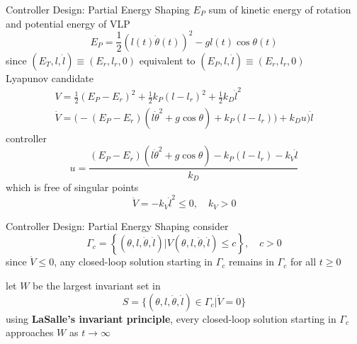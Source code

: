 \documentclass[10pt]{beamer}
\begin{document}
  \begin{frame}{Controller Design: Partial Energy Shaping}
    $E_P$ sum of kinetic energy of rotation and potential energy of VLP
    \begin{equation*}
      E_P = \frac{1}{2}(l(t)\dot{\theta}(t))^2-gl(t)\cos\theta(t)
    \end{equation*}
    since $(E_T, l, \dot{l}) \equiv (E_r, l_r, 0)$ equivalent to
    $(E_P, l, \dot{l}) \equiv (E_r, l_r, 0)$
    \\
    Lyapunov candidate
    \begin{gather*}
      V = \frac{1}{2}(E_P-E_r)^2+\frac{1}{2}k_P(l-l_r)^2+
        \frac{1}{2}k_D\dot{l}^2 \\ 
      \dot{V} = \big(-(E_P-E_r)(l\dot{\theta}^2+g\cos\theta)+k_P(l-l_r)\big)
        + k_D u) \dot{l}
    \end{gather*}
    controller
    \begin{equation*}
      u = \frac{(E_P-E_r)(l\dot{\theta}^2+g\cos\theta)-k_P(l-l_r)
        -k_V\dot{l}}{k_D}
    \end{equation*}
    which is free of singular points
    \begin{equation*}
      \dot{V} = -k_V \dot{l}^2 \le 0, \quad k_V > 0
    \end{equation*}
  \end{frame}

  \begin{frame}{Controller Design: Partial Energy Shaping}
    consider
    \begin{equation*}
      \Gamma_c = \left\{(\theta,l,\dot{\theta},\dot{l})|
        V(\theta,l,\dot{\theta},\dot{l}) \le c\right\}, \quad c > 0
    \end{equation*}
    since $\dot{V} \le 0$, any closed-loop solution starting in $\Gamma_c$
    remains in $\Gamma_c$ for all $t \ge 0$
    
    let $W$ be the largest invariant set in
    \begin{equation*}
      S = \{(\theta,l,\dot{\theta},\dot{l}) \in \Gamma_c|\dot{V}=0\}
    \end{equation*}
    using \textbf{LaSalle's invariant principle}, every closed-loop
    solution starting in $\Gamma_c$ approaches $W$ as $t \to \infty$
  \end{frame}
\end{document}
